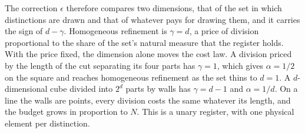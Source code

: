 The correction $\epsilon$ therefore compares two dimensions, that of
the set in which distinctions are drawn and that of whatever pays for
drawing them, and it carries the sign of $d-\gamma$. Homogeneous
refinement is $\gamma=d$, a price of division proportional to the share
of the set's natural measure that the register holds. With the price
fixed, the dimension alone moves the cost law. A division priced by the
length of the cut separating its four parts has $\gamma=1$, which gives
$\alpha=1/2$ on the square and reaches homogeneous refinement as the
set thins to $d=1$. A $d$-dimensional cube divided into $2^d$ parts by
walls has $\gamma=d-1$ and $\alpha=1/d$. On a line the walls are
points, every division costs the same whatever its length, and the
budget grows in proportion to $N$. This is a unary register, with one
physical element per distinction.

